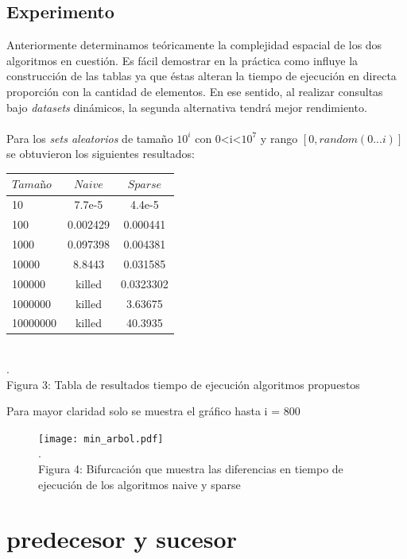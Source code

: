 \documentclass[11pt]{article}
\begin{document}
\subsection{Experimento}
Anteriormente determinamos teóricamente la complejidad espacial de los dos algoritmos en cuestión. Es fácil demostrar en la práctica como influye la construcción de las tablas ya que éstas alteran la tiempo de ejecución en directa proporción con la cantidad de elementos. En ese sentido, al realizar consultas bajo \emph{datasets} dinámicos, la segunda alternativa tendrá mejor rendimiento.\\\\Para los \emph{sets aleatorios} de tamaño $10^i$ con 0<i<$10^7$ y rango $[0,random(0...i)]$ se obtuvieron los siguientes resultados:
\begin{center}\begin{tabular}{|l|c|c|}
\hline
	$Tamaño$ & $Naive$ & $Sparse$\\
\hline
	10 & 7.7e-5 & 4.4e-5\\
\hline
	100 & 0.002429 & 0.000441\\
\hline
	1000 & 0.097398 & 0.004381\\
\hline
	10000 & 8.8443 & 0.031585\\
\hline
	100000 & killed & 0.0323302\\
\hline
	1000000 & killed & 3.63675\\
\hline
	10000000 & killed & 40.3935\\
\hline
\end{tabular}
\\\scriptsize{\color{white}.\color{black}\\Figura 3: Tabla de resultados tiempo de ejecución algoritmos propuestos}
\end{center}
Para mayor claridad solo se muestra el gráfico hasta i = 800
\begin{center}\begin{figure}[htp]
\centering
\texttt{[image: min\_arbol.pdf]}
\\\scriptsize{\color{white}.\color{black}\\Figura 4: Bifurcación que muestra las diferencias en tiempo de ejecución de los algoritmos naive y sparse}
\label{etiqueta}
\end{figure}
\end{center}
\clearpage
\section{predecesor y sucesor}
\end{document}
